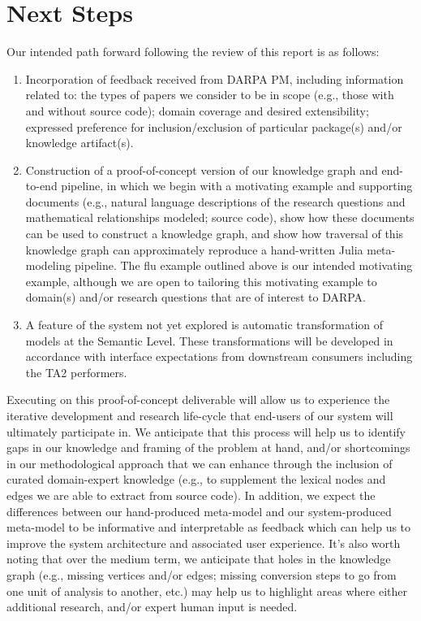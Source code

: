 \documentclass{article}
\begin{document}
\section{Next Steps}
Our intended path forward following the review of this report is as follows:
\begin{enumerate}
    \item Incorporation of feedback received from DARPA PM, including information related to: the types of papers we consider to be in scope (e.g., those with and without source code); domain coverage and desired extensibility; expressed preference for inclusion/exclusion of particular package(s) and/or knowledge artifact(s).
    \item Construction of a proof-of-concept version of our knowledge graph and end-to-end pipeline, in which we begin with a motivating example and supporting documents (e.g., natural language descriptions of the research questions and mathematical relationships modeled; source code), show how these documents can be used to construct a knowledge graph, and show how traversal of this knowledge graph can approximately reproduce a hand-written Julia meta-modeling pipeline. The flu example outlined above is our intended motivating example, although we are open to tailoring this motivating example to domain(s) and/or research questions that are of interest to DARPA.
    \item A feature of the system not yet explored is automatic transformation of models at the Semantic Level. These transformations will be developed in accordance with interface expectations from downstream consumers including the TA2 performers.
\end{enumerate}

Executing on this proof-of-concept deliverable will allow us to experience the iterative development and research life-cycle that end-users of our system will ultimately participate in. We anticipate that this process will help us to identify gaps in our knowledge and framing of the problem at hand, and/or shortcomings in our methodological approach that we can enhance through the inclusion of curated domain-expert knowledge (e.g., to supplement the lexical nodes and edges we are able to extract from source code). In addition, we expect the differences between our hand-produced meta-model and our system-produced meta-model to be informative and interpretable as feedback which can help us to improve the system architecture and associated user experience. 
It's also worth noting that over the medium term, we anticipate that holes in the knowledge graph (e.g., missing vertices and/or edges; missing conversion steps to go from one unit of analysis to another, etc.) may help us to highlight areas where either additional research, and/or expert human input is needed.

\printbibliography
\end{document}
